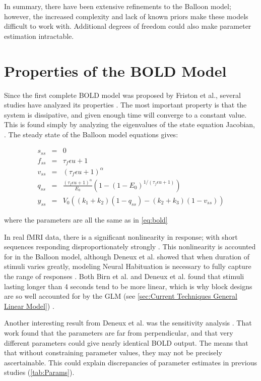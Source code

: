 In summary, there have been extensive refinements to the Balloon
model; however, the increased complexity and lack of known priors 
make these models difficult to work with. Additional degrees of freedom 
could also make parameter estimation intractable.

\section{Properties of the \ac{BOLD} Model}
\label{sec:BOLD Analysis}
Since the first complete \ac{BOLD} model was proposed by Friston et al.,  
several studies have analyzed its properties \cite{Friston2002}.  
The most important property is that the system is dissipative, and given
enough time will converge to a constant value. This is found simply by
analyzing the eigenvalues of the state equation Jacobian, 
\cite{Deneux2006, Hu2009}. The steady state of the Balloon
model equations gives:

\begin{eqnarray}
s_{ss} &=& 0 \nonumber \\
f_{ss} &=& \tau_f\epsilon u + 1\nonumber \\
v_{ss} &=& (\tau_f\epsilon u + 1)^\alpha\nonumber \\
q_{ss} &=& \frac{(\tau_f\epsilon u + 1)^\alpha}{E_0}(1-(1-E_0)^{1/(\tau_f\epsilon u + 1)})\nonumber \\
y_{ss} &=& V_0((k_1+k_2)(1-q_{ss}) - (k_2+k_3)(1-v_{ss}))
\label{eq:steadystate}
\end{eqnarray}

where the parameters are all the same as in \autoref{eq:bold}

In real \ac{fMRI} data, there is a significant nonlinearity in response; with short sequences
responding disproportionately strongly \cite{Birn2001, Wager2005, Deneux2006}.
This nonlinearity is accounted for in the Balloon model, although Deneux et al.
showed that when duration of stimuli varies greatly,
modeling Neural Habituation is necessary to fully capture the range of responses \cite{Deneux2006}. 
Both Birn et al. and Deneux et al. found that 
stimuli lasting longer than 4 seconds 
tend to be more linear, which is why block designs are so well accounted for
by the \ac{GLM} (see \autoref{sec:Current Techniques General Linear Model})
\cite{Birn2001, Deneux2006}.

Another interesting result from Deneux et al. was the sensitivity analysis \cite{Deneux2006}.
That work found that the parameters are far from perpendicular,
and that very different parameters could give nearly identical \ac{BOLD} output.
The means that that without constraining parameter values, they may not be 
precisely ascertainable. This could explain discrepancies of parameter estimates
in previous studies (\autoref{tab:Params}).


